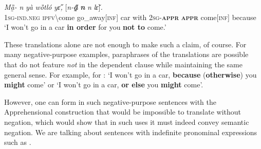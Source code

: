 \documentclass[output=paper,colorlinks,citecolor=brown]{langscibook}
\begin{document}
\ea \label{ex:Fed69}
\gll \textit{Mȁ̰-{\à}} \textit{n{\ù}} \textit{yà} \textit{wȍtló} \textit{yɛ̋,} \textup{[}\textit{n-\textbf{a̰̋}} \textit{\textbf{n{\ù}}} \textit{n{\ù}} \textit{lɛ̌}\textup{]}\textit{.}\\
\textsc{1sg-ind.neg} \textsc{ipfv\backslash}come go\_away[\textsc{inf}] car with \textsc{2sg-\textbf{appr}} \textsc{\textbf{appr}} come[\textsc{inf}] because \\
\glt `I won't go in a car \textbf{in order} for you \textbf{not to} come.'
\z

 These translations alone are not enough to make such a claim, of course. For many negative-purpose examples, paraphrases of the translations are possible that do not feature \textit{not} in the dependent clause while maintaining the same general sense. For example, for : `I won't go in a car, \textbf{because} (\textbf{otherwise}) you \textbf{might} come' or `I won't go in a car, \textbf{or else} you \textbf{might} come'.

However, one can form in  such negative-purpose sentences with the Apprehensional construction that would be impossible to translate without negation, which would show that in such uses it must indeed convey semantic negation. We are talking about sentences with indefinite pronominal expressions such as .

\z
\end{document}
